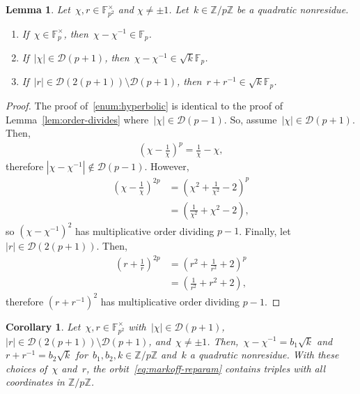 \documentclass{article}
\newtheorem{lemma}{Lemma}
\newtheorem{corollary}{Corollary}
\theoremstyle{definition}
\theoremstyle{remark}
\begin{document}
\begin{lemma}\label{lem:correct-subgroup}
    Let~$\chi, r \in \mathbb{F}_{p^2}^\times$ and $\chi \neq \pm 1$.
    Let~$k \in \mathbb{Z} / p\mathbb{Z}$ be a quadratic nonresidue.
    \begin{enumerate}[label=(\alph*), ref=(\alph*)]
        \item \label{enum:hyperbolic}
            If~$\chi \in \mathbb{F}_p^\times$, then~$\chi - \chi^{-1} \in \mathbb{F}_p$.
        \item \label{enum:elliptic}
            If~$|\chi| \in \mathcal{D}(p + 1)$, then~$\chi - \chi^{-1} \in \sqrt{k} \mathbb{F}_p$.
        \item \label{enum:fixed-cosets}
            If~$|r| \in \mathcal{D}(2(p + 1)) \setminus \mathcal{D}(p + 1)$, then~$r + r^{-1} \in \sqrt{k}\mathbb{F}_p$.
    \end{enumerate}
\end{lemma}
\begin{proof}
    The proof of~\ref{enum:hyperbolic} is identical to the proof of Lemma~\ref{lem:order-divides} where~$|\chi| \in \mathcal{D}(p - 1)$.
    So, assume~$|\chi| \in \mathcal{D}(p + 1)$.
    Then,
    \begin{align*}
        \left(\chi - \frac{1}{\chi}\right)^p = \frac{1}{\chi} - \chi,
    \end{align*}
    therefore $|\chi - \chi^{-1}| \not\in \mathcal{D}(p - 1)$.
    However,
    \begin{align*}
        \left(\chi - \frac{1}{\chi}\right)^{2p} &= \left(\chi^2 + \frac{1}{\chi^2} - 2\right)^p \\
                                                            &= \left(\frac{1}{\chi^2} + \chi^2 - 2\right),
    \end{align*}
    so $(\chi - \chi^{-1})^2$ has multiplicative order dividing $p - 1$.
    Finally, let $|r| \in \mathcal{D}(2(p + 1))$.
    Then,
    \begin{align*}
        \left(r + \frac{1}{r}\right)^{2p} &= \left(r^2 + \frac{1}{r^2} + 2\right)^p \\
                                          &= \left(\frac{1}{r^2} + r^2 + 2\right),
    \end{align*}
    therefore $(r + r^{-1})^2$ has multiplicative order dividing $p - 1$.
\end{proof}

\begin{corollary}\label{cor:elliptic-magic}
    Let~$\chi, r \in \mathbb{F}_{p^2}^\times$ with~$|\chi| \in \mathcal{D}(p + 1)$,~$|r| \in \mathcal{D}(2(p + 1)) \setminus \mathcal{D}(p + 1)$, and~$\chi \neq \pm 1$.
    Then,~$\chi - \chi^{-1} = b_1\sqrt{k}$ and $r + r^{-1} = b_2\sqrt{k}$ for~$b_1, b_2, k \in \mathbb{Z} / p\mathbb{Z}$ and~$k$ a quadratic nonresidue.
    With these choices of~$\chi$ and~$r$, the orbit~\eqref{eq:markoff-reparam} contains triples with all coordinates in $\mathbb{Z} / p\mathbb{Z}$.
\end{corollary}
\end{document}
